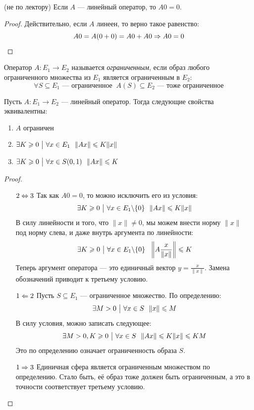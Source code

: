 \begin{proposition} (не по лектору)
	Если $A$ --- линейный оператор, то $A0 = 0$.
\end{proposition}

\begin{proof}
	Действительно, если $A$ линеен, то верно такое равенство:
	\[
		A0 = A(0 + 0) = A0 + A0 \Rightarrow A0 = 0
	\]
\end{proof}

\begin{definition}
	Оператор $A \colon E_1 \to E_2$ называется \textit{ограниченным}, если образ любого ограниченного множества из $E_1$ является ограниченным в $E_2$:
	\[
		\forall S \subseteq E_1 \text{ --- ограниченное }\ A(S) \subseteq E_2 \text{ --- тоже ограниченное}
	\]
\end{definition}

\begin{proposition}
	Пусть $A \colon E_1 \to E_2$ --- линейный оператор. Тогда следующие свойства эквивалентны:
	\begin{enumerate}
		\item $A$ ограничен
		
		\item $\exists K \geqslant 0 \ \big|\  \forall x \in E_1\ \ \|Ax\| \leqslant K\|x\|$
		
		\item $\exists K \geqslant 0 \ \big|\  \forall x \in S(0, 1)\ \ \|Ax\| \leqslant K$
	\end{enumerate}
\end{proposition}

\begin{proof}~
	\begin{itemize}
		\item[$2 \Leftrightarrow 3$] Так как $A0 = 0$, то можно исключить его из условия:
		\[
			\exists K \geqslant 0 \ \big|\  \forall x \in E_1 \backslash \{0\}\ \ \|Ax\| \leqslant K\|x\|
		\]
		В силу линейности и того, что $\|x\| \neq 0$, мы можем внести норму $\|x\|$ под норму слева, и даже внутрь аргумента по линейности:
		\[
			\exists K \geqslant 0 \ \big|\  \forall x \in E_1 \backslash \{0\}\ \ \left\|A\frac{x}{\|x\|}\right\| \leqslant K
		\]
		Теперь аргумент оператора --- это единичный вектор $y = \frac{x}{\|x\|}$. Замена обозначений приводит к третьему условию.
		
		\item[$1 \Leftarrow 2$] Пусть $S \subseteq E_1$ --- ограниченное множество. По определению:
		\[
			\exists M > 0 \ \big|\  \forall x \in S\ \ \|x\| \leqslant M
		\]
		В силу условия, можно записать следующее:
		\[
			\exists M > 0, K \ge 0 \such \forall x \in S\ \ \|Ax\| \le K\|x\| \le KM
		\]
		Это по определению означает ограниченность образа $S$.
		
		\item[$1 \Rightarrow 3$] Единичная сфера является ограниченным множеством по определению. Стало быть, её образ тоже должен быть ограниченным, а это в точности соответствует третьему условию.
	\end{itemize}
\end{proof}